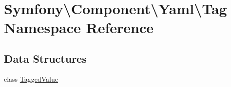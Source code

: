 \hypertarget{namespace_symfony_1_1_component_1_1_yaml_1_1_tag}{}\section{Symfony\textbackslash{}Component\textbackslash{}Yaml\textbackslash{}Tag Namespace Reference}
\label{namespace_symfony_1_1_component_1_1_yaml_1_1_tag}
\subsection*{Data Structures}
\begin{DoxyCompactItemize}
\item 
class \mbox{\hyperlink{class_symfony_1_1_component_1_1_yaml_1_1_tag_1_1_tagged_value}{Tagged\+Value}}
\end{DoxyCompactItemize}
